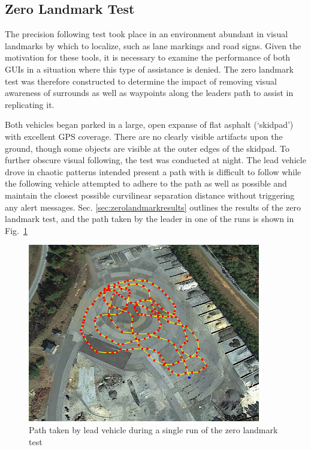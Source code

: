 \subsection{Zero Landmark Test} \label{sec:zerolandmarktest}
The precision following test took place in an environment abundant in visual landmarks by which to localize, such as lane markings and road signs. Given the motivation for these tools, it is necessary to examine the performance of both GUIs in a situation where this type of assistance is denied. The zero landmark test was therefore constructed to determine the impact of removing visual awareness of surrounds as well as waypoints along the leaders path to assist in replicating it.

Both vehicles began parked in a large, open expanse of flat asphalt (`skidpad') with excellent GPS coverage. There are no clearly visible artifacts upon the ground, though some objects are visible at the outer edges of the skidpad. To further obscure visual following, the test was conducted at night. The lead vehicle drove in chaotic patterns intended present a path with is difficult to follow while the following vehicle attempted to adhere to the path as well as possible and maintain the closest possible curvilinear separation distance without triggering any alert messages. Sec. \ref{sec:zerolandmarkresults} outlines the results of the zero landmark test, and the path taken by the leader in one of the runs is shown in Fig.~\ref{fig:zerolandmarkpath}

\begin{figure}[ht] \centering
    \includegraphics[width=4in]{./figs/zero_landmark_path.png}
    \caption{Path taken by lead vehicle during a single run of the zero landmark test} \label{fig:zerolandmarkpath}
\end{figure}




